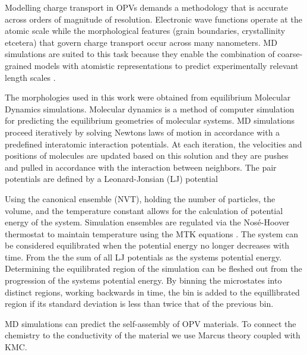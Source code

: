 
Modelling charge transport in OPVs demands a methodology that is accurate across orders of magnitude of
resolution. Electronic wave functions operate at the atomic scale while the morphological features (grain
boundaries, crystallinity etcetera) that govern charge transport occur across many nanometers. MD simulations
are suited to this task because they enable the combination of coarse-grained models with atomistic
representations to predict experimentally relevant length scales \cite{Miller2018}.

The morphologies used in this work  were obtained from equilibrium Molecular Dynamics simulations. 
Molecular dynamics is a method of computer simulation for predicting the equilibrium geometries of molecular
systems. MD simulations proceed iteratively by solving Newtons laws of motion
in accordance with a predefined interatomic interaction potentials.
At each iteration, the velocities and positions of molecules are
updated based on this solution and they are pushes and pulled in accordance with
the interaction between neighbors. The pair potentials are defined by a Leonard-Jonsian (LJ) potential \cite{Jones1924a}

Using the canonical ensemble (NVT), holding the number of
particles, the volume, and the temperature constant allows for the calculation of 
potential energy of the system.  
Simulation ensembles are regulated via the Nos\'{e}-Hoover thermostat \cite{Hoover1985} to maintain 
temperature using the MTK equations \cite{Martyna1994d}\cite{Cao1996}.
The system can be considered equilibrated when the potential energy no longer decreases with time. 
From the the sum of all LJ potentials as the systems potential energy. Determining the equilibrated region of the
simulation can be fleshed out from the progression of the systems potential energy. By binning the microstates
into distinct regions, working backwards in time, the bin is added to the equillibrated region if its standard
deviation is less than twice that of the previous bin. \cite{Henry2017a}

MD simulations can predict the self-assembly of OPV materials. To connect the chemistry to the
conductivity of the material we use Marcus theory coupled with KMC.


